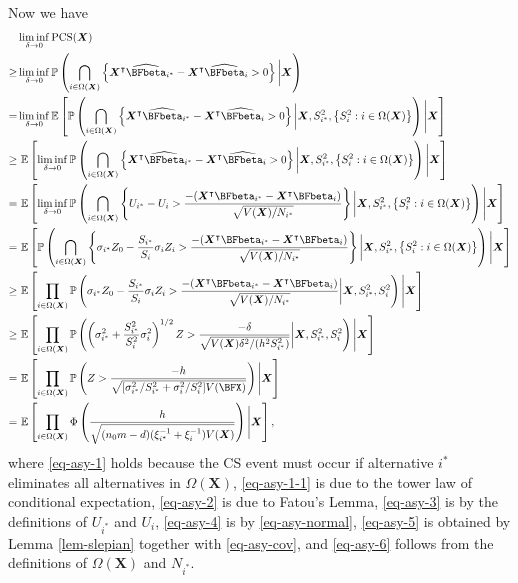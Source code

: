 \documentclass[ijoc,nonblindrev]{informs3}
\def\E{\mathbb{E}}
\def\pr{\mathbb{P}}
\def\bX{{\bm X}}
\begin{document}
Now we have
\begin{align}
&\liminf_{\delta\to 0} \mathrm{PCS}(\bX) \nonumber \\
\geq& \liminf_{\delta\to 0} \pr \left( \bigcap_{i \in \Omega(\bX)} \left\{ \bX^\intercal \widehat{\BFbeta}_{i^*} - \bX^\intercal \widehat{\BFbeta}_i  > 0 \right\} \bigg| \bX \right) \label{eq-asy-1}\\
=& \liminf_{\delta\to 0} \E \left[ \pr \left( \bigcap_{i \in \Omega(\bX)} \left\{ \bX^\intercal \widehat{\BFbeta}_{i^*} - \bX^\intercal \widehat{\BFbeta}_i  > 0 \right\} \bigg| \bX, S_{i^*}^2, \left\{S_i^2: i \in \Omega(\bX) \right\} \right) \Bigg| \bX \right] \label{eq-asy-1-1}\\
\geq & \ \E \left[\liminf_{\delta\to 0} \pr \left( \bigcap_{i \in \Omega(\bX)} \left\{\bX^\intercal \widehat{\BFbeta}_{i^*} - \bX^\intercal \widehat{\BFbeta}_i  > 0 \right\} \bigg| \bX, S_{i^*}^2, \left\{S_i^2: i \in \Omega(\bX) \right\} \right) \Bigg| \bX \right] \label{eq-asy-2}\\
= & \ \E \left[\liminf_{\delta\to 0} \pr \left( \bigcap_{i \in \Omega(\bX)} \left\{U_{i^*}- U_i  > \frac{-(\bX^\intercal {\BFbeta}_{i^*} - \bX^\intercal {\BFbeta}_i)}{\sqrt{V(\bX)/N_{i^*}}} \right\} \bigg| \bX, S_{i^*}^2, \left\{S_i^2: i \in \Omega(\bX) \right\} \right) \Bigg| \bX \right] \label{eq-asy-3}\\
= & \ \E \left[ \pr \left( \bigcap_{i \in \Omega(\bX)} \left\{\sigma_{i^*} Z_0 - \frac{S_{i^*}}{S_i}\sigma_i Z_i > \frac{-(\bX^\intercal {\BFbeta}_{i^*} - \bX^\intercal {\BFbeta}_i)}{\sqrt{V(\bX)/N_{i^*}}} \right\} \bigg| \bX, S_{i^*}^2, \left\{S_i^2: i \in \Omega(\bX) \right\} \right) \Bigg| \bX \right] \label{eq-asy-4}\\
\geq & \ \E \left[\prod_{i\in\Omega(\bX)} \pr \left(\sigma_{i^*} Z_0 - \frac{S_{i^*}}{S_i}\sigma_i Z_i > \frac{-(\bX^\intercal {\BFbeta}_{i^*} - \bX^\intercal {\BFbeta}_i)}{\sqrt{V(\bX)/N_{i^*}}} \bigg| \bX, S_{i^*}^2, S_i^2\right)  \Bigg| \bX \right] \label{eq-asy-5}\\
\geq & \ \E \left[\prod_{i\in\Omega(\bX)} \pr \left( \left(\sigma_{i^*}^2 +\frac{S_{i^*}^2}{S_i^2}\sigma_i^2\right)^{1/2}Z  > \frac{ -\delta }{\sqrt{V(\bX)\delta^2/(h^2S_{i^*}^2)}} \bigg| \bX, S_{i^*}^2, S_i^2\right)  \Bigg| \bX \right] \label{eq-asy-6}\\
= & \ \E \left[\prod_{i\in\Omega(\bX)} \pr \left( Z > \frac{-h}{\sqrt{[\sigma_{i^*}^2/S_{i^*}^2 + \sigma_i^2/S_i^2]V(\BFX)}} \right)  \Bigg| \bX \right] \nonumber\\
= & \ \E \left[ \prod_{i\in\Omega(\bX)} \Phi\left( \frac{h}{\sqrt{(n_0m-d)(\xi_{i^*}^{-1} + \xi_i^{-1})V(\bX)}}  \right)\Bigg| \bX \right], \nonumber
\end{align}
where \eqref{eq-asy-1} holds because the CS event must occur if alternative $i^*$ eliminates all alternatives in $\Omega(\bX)$,
\eqref{eq-asy-1-1} is due to the tower law of conditional expectation,
\eqref{eq-asy-2} is due to Fatou's Lemma,
\eqref{eq-asy-3} is by the definitions of $U_{i^*}$ and $U_i$,
\eqref{eq-asy-4} is by \eqref{eq-asy-normal},
\eqref{eq-asy-5} is obtained by Lemma \ref{lem-slepian} together with \eqref{eq-asy-cov},
and \eqref{eq-asy-6} follows from the definitions of $\Omega(\bX)$ and $N_{i^*}$.
\end{document}
